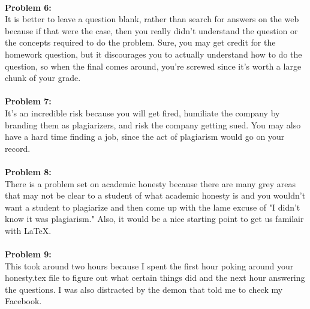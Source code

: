 \documentclass[12pt]{article} %
\begin{document}
\\
\textbf{Problem 6:}
\\
\noindent
It is better to leave a question blank, rather than search for answers on the web because if that 
were the case, then you really didn't understand the question or the concepts required to do the
problem. Sure, you may get credit for the homework question, but it discourages you to actually
understand how to do the question, so when the final comes around, you're screwed since it's 
worth a large chunk of your grade.  
\\
\\
\textbf{Problem 7:}
\\
\noindent
It's an incredible risk because you will get fired, humiliate the company by branding them as plagiarizers,
and risk the company getting sued. You may also have a hard time finding a job, since the act of
plagiarism would go on your record.
\\
\\
\textbf{Problem 8:}
\\
\noindent
There is a problem set on academic honesty because there are many grey areas that may not be clear
to a student of what academic honesty is and you wouldn't want a student to plagiarize and then come
up with the lame excuse of "I didn't know it was plagiarism." Also, it would be a nice starting point to
get us familair with LaTeX.
\\
\\
\textbf{Problem 9:}
\\
\noindent
This took around two hours because I spent the first hour poking around your honesty.tex file to figure out
what certain things did and the next hour answering the questions. I was also distracted by the demon 
that told me to check my Facebook.
\end{document}
